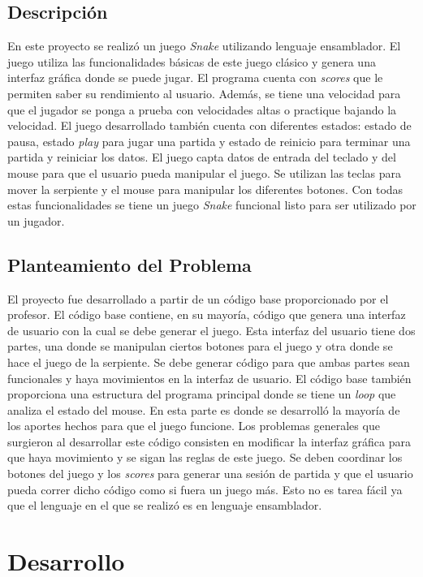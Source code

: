 \documentclass[12pt]{article}
\begin{document}
\subsection*{Descripción}
En este proyecto se realizó un juego \textit{Snake} utilizando lenguaje ensamblador. El juego utiliza las funcionalidades básicas de este juego clásico y genera una interfaz gráfica donde se puede jugar. El programa cuenta con \textit{scores} que le permiten saber su rendimiento al usuario. Además, se tiene una velocidad para que el jugador se ponga a prueba con velocidades altas o practique bajando la velocidad. El juego desarrollado también cuenta con diferentes estados: estado de pausa, estado \textit{play} para jugar una partida y estado de reinicio para terminar una partida y reiniciar los datos. El juego capta datos de entrada del teclado y del mouse para que el usuario pueda manipular el juego. Se utilizan las teclas para mover la serpiente y el mouse para manipular los diferentes botones. Con todas estas funcionalidades se tiene un juego \textit{Snake} funcional listo para ser utilizado por un jugador.

\subsection*{Planteamiento del Problema}
El proyecto fue desarrollado a partir de un código base proporcionado por el profesor. El código base contiene, en su mayoría, código que genera una interfaz de usuario con la cual se debe generar el juego. Esta interfaz del usuario tiene dos partes, una donde se manipulan ciertos botones para el juego y otra donde se hace el juego de la serpiente. Se debe generar código para que ambas partes sean funcionales y haya movimientos en la interfaz de usuario. El código base también proporciona una estructura del programa principal donde se tiene un \textit{loop} que analiza el estado del mouse. En esta parte es donde se desarrolló la mayoría de los aportes hechos para que el juego funcione. Los problemas generales que surgieron al desarrollar este código consisten en modificar la interfaz gráfica para que haya movimiento y se sigan las reglas de este juego. Se deben coordinar los botones del juego y los \textit{scores} para generar una sesión de partida y que el usuario pueda correr dicho código como si fuera un juego más. Esto no es tarea fácil ya que el lenguaje en el que se realizó es en lenguaje ensamblador.


\section*{Desarrollo}
\end{document}
